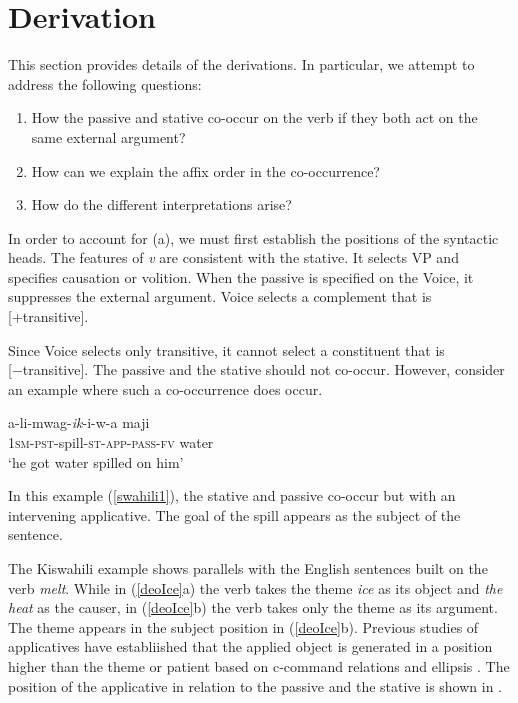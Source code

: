 \documentclass[output=paper]{langscibook}
\begin{document}
\section{Derivation}\largerpage
This section provides details of the derivations. In particular, we attempt to address the following questions: 

\begin{enumerate}[label=(\alph*)]
    \item How the passive and stative co-occur on the verb if they both act on the same external argument?
    \item How can we explain the affix order in the co-occurrence?
    \item How do the different interpretations arise?
\end{enumerate}

In order to account for (a), we must first establish the positions of the syntactic heads. The features of \textit{v} are consistent with the stative. It selects VP and specifies causation or volition. When the passive is specified on the Voice, it suppresses the external argument. Voice selects a complement that is [+transitive]. 

Since Voice selects only transitive, it cannot select a constituent that is [−trans\-i\-tive]. The passive and the stative should not co-occur. However, consider an example where such a co-occurrence does occur. 

\begin{exe}
\ex\label{swahili1}
\gll a-li-mwag-\textit{ik}-i-w-a   maji\\
\textsc{1sm-pst}-spill-\textsc{st-app-pass-fv}  water\\
\glt `he got water spilled on him'
\end{exe}
In this example (\ref{swahili1}), the stative and passive co-occur but with an intervening applicative. The goal of the spill appears as the subject of the sentence. 

The Kiswahili example shows parallels with the English sentences built on the verb \textit{melt}. While in (\ref{deoIce}a) the verb takes the theme \textit{ice} as its object and \textit{the heat} as the causer, in (\ref{deoIce}b) the verb takes only the theme as its argument. The theme appears in the subject position in (\ref{deoIce}b). Previous studies of applicatives have establiished that the applied object is generated in a position higher than the theme or patient based on c-command relations and ellipsis \citep{Marantz1993,Ngonyani1996,pylkkanen08}. The position of the applicative in relation to the passive and the stative is shown in .
\end{document}
